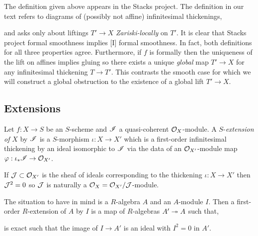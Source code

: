 \documentclass[12pt]{article}
\begin{document}
\begin{rmk}
The definition given above appears in the Stacks project. The definition in our text refers to diagrams of (possibly not affine) infinitesimal thickenings,
\begin{center}
\end{center}
and asks only about liftings $T' \to X$ \textit{Zariski-locally} on $T'$. It is clear that Stacks project formal smoothness implies [I] formal smoothness. In fact, both definitions for all three properties agree. Furthermore, if $f$ is formally \etale then the uniqueness of the lift on affines implies gluing so there exists a unique \textit{global} map $T' \to X$ for any infinitesimal thickening $T \to T'$. This contrasts the smooth case for which we will construct a global obstruction to the existence of a global lift $T' \to X$.
\end{rmk}

\subsection{Extensions}

\begin{defn}
Let $f : X \to S$ be an $S$-scheme and $\mathscr{I}$ a quasi-coherent $\mathcal{O}_{X}$-module. A $S$-\textit{extension of} $X$ by $\mathscr{I}$ is a $S$-morphism $\iota : X \to X'$ which is a first-order infinitesimal thickening by an ideal isomorphic to $\mathscr{I}$ via the data of an $\mathcal{O}_{X'}$-module map $\varphi : \iota_* \mathscr{I} \to \mathcal{O}_{X'}$.
\end{defn}

\begin{rmk}
If $\mathcal{J} \subset \mathcal{O}_{X'}$ is the sheaf of ideals corresponding to the thickening $\iota : X \to X'$ then $\mathcal{J}^2 = 0$ so $\mathcal{J}$ is naturally a $\mathcal{O}_{X} = \mathcal{O}_{X'}/\mathcal{J}$-module.
\end{rmk}

\begin{rmk}
The situation to have in mind is a $R$-algebra $A$ and an $A$-module $I$. Then a first-order $R$-extension of $A$ by $I$ is a map of $R$-algebras $A' \twoheadrightarrow A$ such that,
\begin{center}
\end{center}
is exact such that the image of $I \to A'$ is an ideal with $I^2 = 0$ in $A'$.
\end{rmk}
\end{document}
